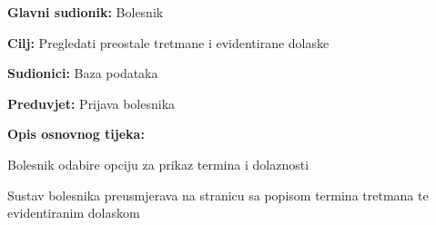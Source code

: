 			\begin{packed_item}
				
				\item \textbf{Glavni sudionik: }Bolesnik
				\item  \textbf{Cilj:} Pregledati preostale tretmane i evidentirane dolaske
				\item  \textbf{Sudionici:} Baza podataka
				\item  \textbf{Preduvjet:} Prijava bolesnika
				\item  \textbf{Opis osnovnog tijeka:}
				
				
				\item[] \begin{packed_enum}
					
					\item Bolesnik odabire opciju za prikaz termina i dolaznosti
					\item Sustav bolesnika preusmjerava na stranicu sa popisom termina tretmana te evidentiranim dolaskom
				\end{packed_enum}
				
				
				
			\end{packed_item}
		
